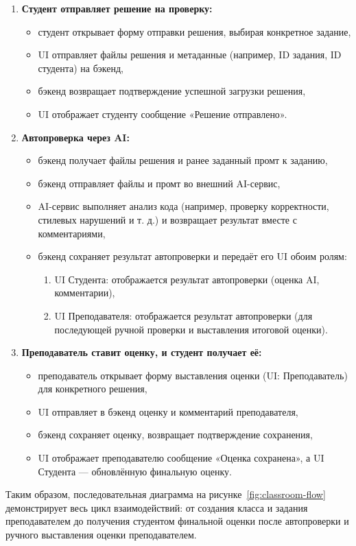 \begin{enumerate}
    \item \textbf{Студент отправляет решение на проверку:}
    \begin{itemize}
        \item студент открывает форму отправки решения, выбирая конкретное задание,
        \item UI отправляет файлы решения и метаданные (например, ID задания, ID студента) на бэкенд,
        \item бэкенд возвращает подтверждение успешной загрузки решения,
        \item UI отображает студенту сообщение «Решение отправлено».
    \end{itemize}

    \item \textbf{Автопроверка через AI:}
    \begin{itemize}
        \item бэкенд получает файлы решения и ранее заданный промт к заданию,
        \item бэкенд отправляет файлы и промт во внешний AI-сервис,
        \item AI-сервис выполняет анализ кода (например, проверку корректности, стилевых нарушений и т. д.) и возвращает результат вместе с комментариями,
        \item бэкенд сохраняет результат автопроверки и передаёт его UI обоим ролям:
        \begin{enumerate}
            \item UI Студента: отображается результат автопроверки (оценка AI, комментарии),
            \item UI Преподавателя: отображается результат автопроверки (для последующей ручной проверки и выставления итоговой оценки).
        \end{enumerate}
    \end{itemize}

    \item \textbf{Преподаватель ставит оценку, и студент получает её:}
    \begin{itemize}
        \item преподаватель открывает форму выставления оценки (UI: Преподаватель) для конкретного решения,
        \item UI отправляет в бэкенд оценку и комментарий преподавателя,
        \item бэкенд сохраняет оценку, возвращает подтверждение сохранения,
        \item UI отображает преподавателю сообщение «Оценка сохранена», а UI Студента — обновлённую финальную оценку.
    \end{itemize}
\end{enumerate}

Таким образом, последовательная диаграмма на рисунке~\ref{fig:classroom-flow} демонстрирует весь цикл взаимодействий: от создания класса и задания преподавателем до получения студентом финальной оценки после автопроверки и ручного выставления оценки преподавателем.
